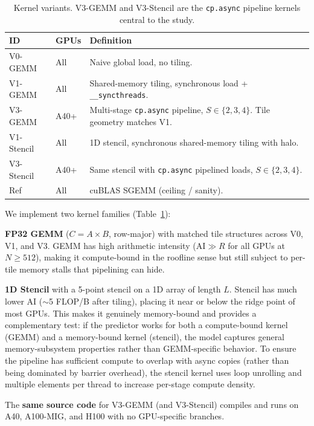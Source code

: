 \documentclass[sigplan,nonacm,10pt]{acmart}
\begin{document}
\begin{table}[t]
\centering
\small
\caption{Kernel variants.  V3-GEMM and V3-Stencil are the
\texttt{cp.async} pipeline kernels central to the study.}
\label{tab:variants}
\begin{tabular}{@{}llp{5.2cm}@{}}
\toprule
\textbf{ID} & \textbf{GPUs} & \textbf{Definition} \\
\midrule
V0-GEMM  & All   & Naive global load, no tiling. \\
V1-GEMM  & All   & Shared-memory tiling, synchronous load +
                    \texttt{\_\_syncthreads}. \\
V3-GEMM  & A40+  & Multi-stage \texttt{cp.async} pipeline,
                    $S \in \{2, 3, 4\}$.  Tile geometry matches V1. \\
\midrule
V1-Stencil & All  & 1D stencil, synchronous shared-memory tiling
                     with halo. \\
V3-Stencil & A40+ & Same stencil with \texttt{cp.async} pipelined
                     loads, $S \in \{2, 3, 4\}$. \\
\midrule
Ref & All   & cuBLAS SGEMM (ceiling / sanity). \\
\bottomrule
\end{tabular}
\end{table}

We implement two kernel families (Table~\ref{tab:variants}):

\textbf{FP32 GEMM} ($C = A \times B$, row-major) with matched tile
structures across V0, V1, and V3.
GEMM has high arithmetic intensity ($\text{AI} \gg R$ for all GPUs at
$N \ge 512$), making it compute-bound in the roofline sense but still
subject to per-tile memory stalls that pipelining can hide.

\textbf{1D Stencil} with a 5-point stencil on a 1D array of length $L$.
Stencil has much lower AI ($\sim$5 FLOP/B after tiling), placing it
near or below the ridge point of most GPUs.  This makes it genuinely
memory-bound and provides a complementary test:
if the predictor works for both a compute-bound kernel (GEMM) and a
memory-bound kernel (stencil), the model captures general
memory-subsystem properties rather than GEMM-specific behavior.
To ensure the pipeline has sufficient compute to overlap with async
copies (rather than being dominated by barrier overhead), the stencil
kernel uses loop unrolling and multiple elements per thread to increase
per-stage compute density.

The \textbf{same source code} for V3-GEMM (and V3-Stencil) compiles and
runs on A40, A100-MIG, and H100 with no GPU-specific branches.
\end{document}
